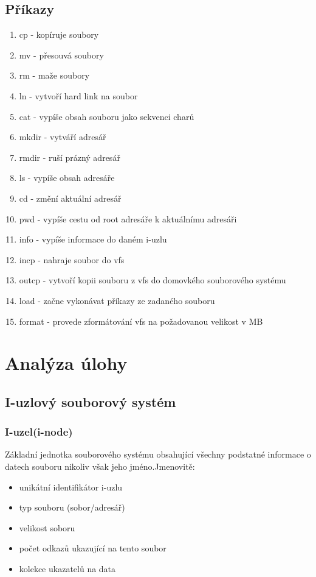 \documentclass[12pt, a4paper]{report}
\begin{document}
\section{Příkazy}
\begin{enumerate}
 \item cp - kopíruje soubory
 \item mv - přesouvá soubory
 \item rm - maže soubory
 \item ln - vytvoří hard link na soubor
 \item cat - vypíše obsah souboru jako sekvenci charů
 
 \item mkdir - vytváří adresář
 \item rmdir - ruší prázný adresář
 \item ls - vypíše obsah adresáře
 

 \item cd - změní aktuální adresář
 \item pwd - vypíše cestu od root adresáře k aktuálnímu adresáři
 \item info - vypíše informace do daném i-uzlu
 
 \item incp - nahraje soubor do vfs
 \item outcp - vytvoří kopii souboru z vfs do domovkého souborového systému
 \item load - začne vykonávat příkazy ze zadaného souboru
 \item format - provede zformátování vfs na požadovanou velikost v MB
\end{enumerate}





\chapter{Analýza úlohy}
\section{I-uzlový souborový systém}
\subsection{I-uzel(i-node)}
Základní jednotka souborového systému obsahující všechny podstatné informace o datech souboru nikoliv však jeho jméno.Jmenovitě:
\begin{itemize}
 \item unikátní identifikátor i-uzlu 
 \item typ souboru (sobor/adresář)
 \item velikost soboru
 \item počet odkazů ukazující na tento soubor
 \item kolekce ukazatelů na data
\end{itemize}
\end{document}
